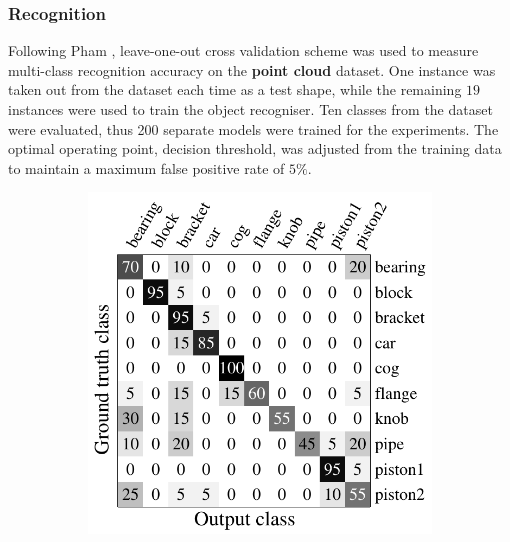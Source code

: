 \subsubsection{Recognition}
Following Pham \etal \cite{Pham2011}, leave-one-out cross validation scheme was used to measure multi-class recognition accuracy on the \textbf{point cloud} dataset. One instance was taken out from the dataset each time as a test shape, while the remaining $19$ instances were used to train the object recogniser. Ten classes from the dataset were evaluated, thus 200 separate models were trained for the experiments. The optimal operating point, \ie decision threshold, was adjusted from the training data to maintain a maximum false positive rate of $5\%$. 

\begin{figure}[ht]
	\centering
	\begin{subfigure}[t]{0.32\linewidth}
		\label{fig/reg/confusion_sap}
		\includegraphics[width=1\linewidth]{fig/reg/confusion_sap.pdf}
	\end{subfigure}
	\begin{subfigure}[t]{0.32\linewidth}
		\label{fig/reg/confusion_meanshift}

\end{subfigure}
\end{figure}
